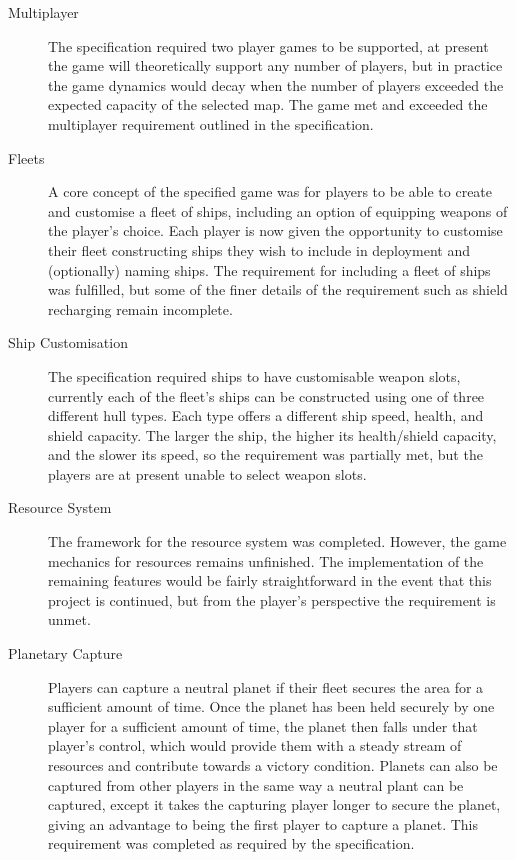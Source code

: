 \begin{description}
  \item[Multiplayer] The specification required two player games to be supported, at present the game will theoretically support any number of players, but in practice the game dynamics would decay when the number of players exceeded the expected capacity of the selected map. The game met and exceeded the multiplayer requirement outlined in the specification.

  \item[Fleets] A core concept of the specified game was for players to be able to create and customise a fleet of ships, including an option of equipping weapons of the player's choice. Each player is now given the opportunity to customise their fleet constructing ships they wish to include in deployment and (optionally) naming ships. The requirement for including a fleet of ships was fulfilled, but some of the finer details of the requirement such as shield recharging remain incomplete.

  \item[Ship Customisation] The specification required ships to have customisable weapon slots, currently each of the fleet's ships can be constructed using one of three different hull types. Each type offers a different ship speed, health, and shield capacity. The larger the ship, the higher its health/shield capacity, and the slower its speed, so the requirement was partially met, but the players are at present unable to select weapon slots.

  \item[Resource System] The framework for the resource system was completed. However, the game mechanics for resources remains unfinished. The implementation of the remaining features would be fairly straightforward in the event that this project is continued, but from the player's perspective the requirement is unmet.

  \item[Planetary Capture] Players can capture a neutral planet if their fleet secures the area for a sufficient amount of time. Once the planet has been held securely by one player for a sufficient amount of time, the planet then falls under that player's control, which would provide them with a steady stream of resources and contribute towards a victory condition. Planets can also be captured from other players in the same way a neutral plant can be captured, except it takes the capturing player longer to secure the planet, giving an advantage to being the first player to capture a planet. This requirement was completed as required by the specification.


\end{description}
